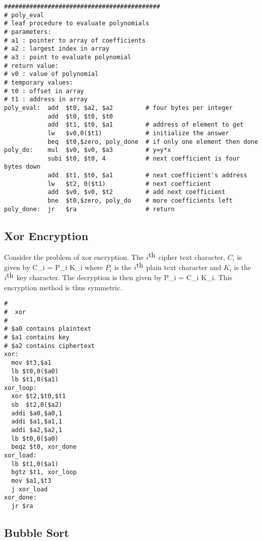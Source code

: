 {\color{ans}

\begin{verbatim}
###########################################
# poly_eval
# leaf procedure to evaluate polynomials
# parameters:
# a1 : pointer to array of coefficients
# a2 : largest index in array
# a3 : point to evaluate polynomial
# return value:
# v0 : value of polynomial
# temporary values:
# t0 : offset in array
# t1 : address in array
poly_eval:  add  $t0, $a2, $a2         # four bytes per integer
            add  $t0, $t0, $t0
            add  $t1, $t0, $a1         # address of element to get
            lw   $v0,0($t1)            # initialize the answer
            beq  $t0,$zero, poly_done  # if only one element then done
poly_do:    mul  $v0, $v0, $a3         # y=y*x
            subi $t0, $t0, 4           # next coefficient is four bytes down
            add  $t1, $t0, $a1         # next coefficient's address
            lw   $t2, 0($t1)           # next coefficient
            add  $v0, $v0, $t2         # add next coefficient
            bne  $t0,$zero, poly_do    # more coefficients left
poly_done:  jr   $ra                   # return
\end{verbatim}

}


\subsection{Xor Encryption}

Consider the problem of xor encryption.  The $i^{\hbox{th}}$ cipher text character, $C_i$ is given by
\beqn
C_i = P_i \oplus K_i
\eeqn
where $P_i$ is the $i^{\hbox{th}}$ plain text character and $K_i$ is the $i^{\hbox{th}}$ key character.  The decryption is then given by
\beqn
P_i = C_i \oplus K_i.
\eeqn
This encryption method is thus symmetric.

\begin{verbatim}
#
#  xor
#
# $a0 contains plaintext
# $a1 contains key
# $a2 contains ciphertext
xor:
  mov $t3,$a1
  lb $t0,0($a0)
  lb $t1,0($a1)
xor_loop:
  xor $t2,$t0,$t1
  sb  $t2,0($a2)
  addi $a0,$a0,1
  addi $a1,$a1,1
  addi $a2,$a2,1
  lb $t0,0($a0)
  beqz $t0, xor_done
xor_load:
  lb $t1,0($a1)
  bgtz $t1, xor_loop
  mov $a1,$t3
  j xor_load
xor_done:
  jr $ra
\end{verbatim}

\subsection{Bubble Sort}


